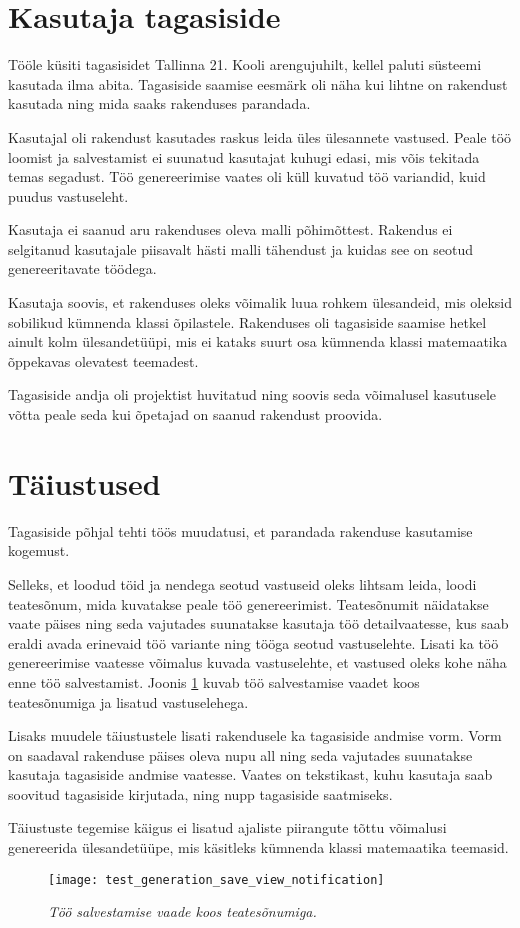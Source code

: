 \section{Kasutaja tagasiside}

Tööle küsiti tagasisidet Tallinna 21. Kooli arengujuhilt, kellel paluti süsteemi kasutada ilma abita. Tagasiside saamise eesmärk oli näha kui lihtne on rakendust kasutada ning mida saaks rakenduses parandada.

Kasutajal oli rakendust kasutades raskus leida üles ülesannete vastused. Peale töö loomist ja salvestamist ei suunatud kasutajat kuhugi edasi, mis võis tekitada temas segadust. Töö genereerimise vaates oli küll kuvatud töö variandid, kuid puudus vastuseleht.

Kasutaja ei saanud aru rakenduses oleva malli põhimõttest. Rakendus ei selgitanud kasutajale piisavalt hästi malli tähendust ja kuidas see on seotud genereeritavate töödega.

Kasutaja soovis, et rakenduses oleks võimalik luua rohkem ülesandeid, mis oleksid sobilikud kümnenda klassi õpilastele. Rakenduses oli tagasiside saamise hetkel ainult kolm ülesandetüüpi, mis ei kataks suurt osa kümnenda klassi matemaatika õppekavas olevatest teemadest.

Tagasiside andja oli projektist huvitatud ning soovis seda võimalusel kasutusele võtta peale seda kui õpetajad on saanud rakendust proovida.

\section{Täiustused}

Tagasiside põhjal tehti töös muudatusi, et parandada rakenduse kasutamise kogemust.

Selleks, et loodud töid ja nendega seotud vastuseid oleks lihtsam leida, loodi teatesõnum, mida kuvatakse peale töö genereerimist. Teatesõnumit näidatakse vaate päises ning seda vajutades suunatakse kasutaja töö detailvaatesse, kus saab eraldi avada erinevaid töö variante ning tööga seotud vastuselehte. Lisati ka töö genereerimise vaatesse võimalus kuvada vastuselehte, et vastused oleks kohe näha enne töö salvestamist. Joonis \ref{fig:test-generation-save-view-notification} kuvab töö salvestamise vaadet koos teatesõnumiga ja lisatud vastuselehega.

Lisaks muudele täiustustele lisati rakendusele ka tagasiside andmise vorm. Vorm on saadaval rakenduse päises oleva nupu all ning seda vajutades suunatakse kasutaja tagasiside andmise vaatesse. Vaates on tekstikast, kuhu kasutaja saab soovitud tagasiside kirjutada, ning nupp tagasiside saatmiseks.

Täiustuste tegemise käigus ei lisatud ajaliste piirangute tõttu võimalusi genereerida ülesandetüüpe, mis käsitleks kümnenda klassi matemaatika teemasid.

\begin{figure}[H]
    \centering
    \texttt{[image: test\_generation\_save\_view\_notification]}
    \caption{\emph{Töö salvestamise vaade koos teatesõnumiga.}}
    \label{fig:test-generation-save-view-notification}
\end{figure}
